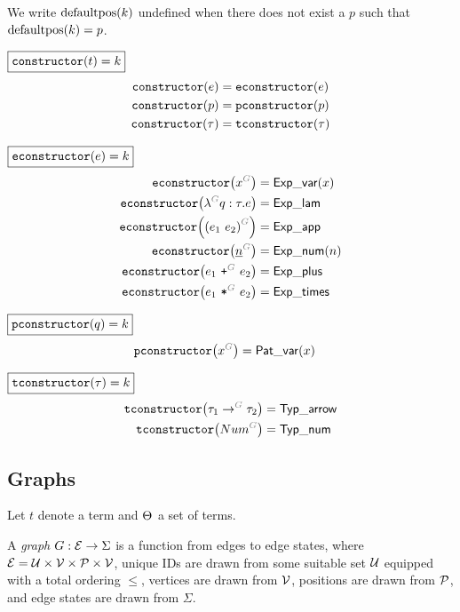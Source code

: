 We write $\defaultpos{k}$ undefined when there does not exist a $p$ such that $\defaultpos{k} = p$.

\noindent $\boxed{\constructor{t} = k}$
%
\begin{align*}
  \constructor{e} &= \econstructor{e} \\
  \constructor{p} &= \pconstructor{p} \\
  \constructor{\tau} &= \tconstructor{\tau}
\end{align*}

\noindent $\boxed{\econstructor{e} = k}$
%
\begin{align*}
  \econstructor{\eVar{G}{x}} &= \ExpVar(x) \\
  \econstructor{\eFun{G}{q}{\tau}{e}} &= \ExpLam \\
  \econstructor{\eApp{G}{e_1}{e_2}} &= \ExpApp \\
  \econstructor{\eNum{G}{n}} &= \ExpNum(n) \\
  \econstructor{\ePlus{G}{e_1}{e_2}} &= \ExpPlus \\
  \econstructor{\eTimes{G}{e_1}{e_2}} &= \ExpTimes
\end{align*}

\noindent $\boxed{\pconstructor{q} = k}$
%
\begin{align*}
  \pconstructor{\pVar{G}{x}} &= \PatVar(x)
\end{align*}

\noindent $\boxed{\tconstructor{\tau} = k}$
%
\begin{align*}
  \tconstructor{\tArrow{G}{\tau_1}{\tau_2}} &= \TypArrow \\
  \tconstructor{\tNum{G}} &= \TypNum
\end{align*}


\subsection{Graphs}

Let $t$ denote a term and $\Set$ a set of terms.

\begin{definition}
  A \emph{graph} $G : \E \rightarrow \Sigma$ is a function from edges to edge states,
  where $\E = \U \times \V \times \P \times \V$,
  unique IDs are drawn from some suitable set $\U$ equipped with a total ordering $\leq$,
  vertices are drawn from $\V$,
  positions are drawn from $\P$,
  and edge states are drawn from $\Sigma$.
\end{definition}

